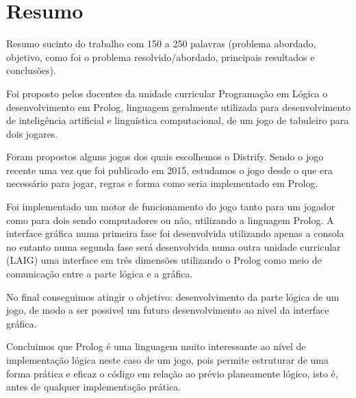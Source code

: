 \documentclass[a4paper]{article}
\begin{document}

\newpage

\section*{Resumo}
Resumo sucinto do trabalho com 150 a 250 palavras (problema abordado, objetivo, como foi o problema resolvido/abordado, principais resultados e conclusões).

Foi proposto pelos docentes da unidade curricular Programação em Lógica o desenvolvimento em Prolog, linguagem geralmente utilizada para desenvolvimento de inteligência artificial e linguística computacional, de um jogo de tabuleiro para dois jogares.

Foram propostos alguns jogos dos quais escolhemos o Distrify. Sendo o jogo recente uma vez que foi publicado em 2015, estudamos o jogo desde o que era necessário para jogar, regras e forma como seria implementado em Prolog.

Foi implementado um motor de funcionamento do jogo tanto para um jogador como para dois sendo computadores ou não, utilizando a linguagem Prolog. A interface gráfica numa primeira fase foi desenvolvida utilizando apenas a consola no entanto numa segunda fase será desenvolvida numa outra unidade curricular (LAIG) uma interface em três dimensões utilizando o Prolog como meio de comunicação entre a parte lógica e a gráfica.

No final conseguimos atingir o objetivo: desenvolvimento da parte lógica de um jogo, de modo a ser possivel um futuro desenvolvimento ao nivel da interface gráfica. 

Concluimos que Prolog é uma linguagem muito interessante ao nível de implementação lógica neste caso de um jogo, pois permite estruturar de uma forma prática e eficaz o código em relação ao prévio planeamente lógico, isto é, antes de qualquer implementação prática.


\newpage

\tableofcontents


\end{document}

